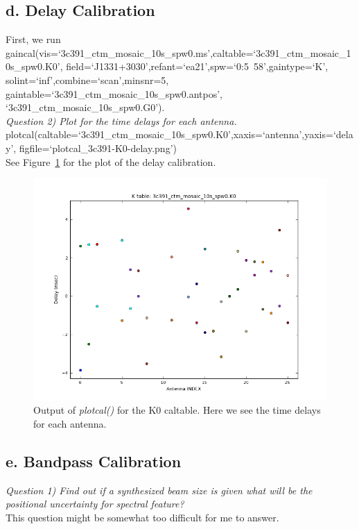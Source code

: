 \documentclass[12pt, a4paper]{article}
\begin{document}
\subsection{d. Delay Calibration}
First, we run {\tiny gaincal(vis=`3c391\_ctm\_mosaic\_10s\_spw0.ms',caltable=`3c391\_ctm\_mosaic\_10s\_spw0.K0', field=`J1331+3030',refant=`ea21',spw=`0:5~58',gaintype=`K', solint=`inf',combine=`scan',minsnr=5, gaintable=\lbrack `3c391\_ctm\_mosaic\_10s\_spw0.antpos', `3c391\_ctm\_mosaic\_10s\_spw0.G0'\rbrack)}. \\
\noindent \textit{Question 2) Plot for the time delays for each antenna.} \\
{\tiny plotcal(caltable=`3c391\_ctm\_mosaic\_10s\_spw0.K0',xaxis=`antenna',yaxis=`delay', figfile=`plotcal\_3c391-K0-delay.png') } \\
See Figure~\ref{fig:part4subD} for the plot of the delay calibration.

\begin{figure}[h!]
    \centering
    \includegraphics[scale=0.65]{../Imaging/plots/plotcal_3c391-K0-delay.png}
    \caption{Output of \emph{plotcal()} for the K0 caltable. Here we see the time delays for each antenna. \label{fig:part4subD}}
\end{figure}
 
\subsection{e. Bandpass Calibration}
\noindent \textit{Question 1) Find out if a synthesized beam size is given what will be the positional uncertainty for spectral feature?} \\
This question might be somewhat too difficult for me to answer. \\
\end{document}
